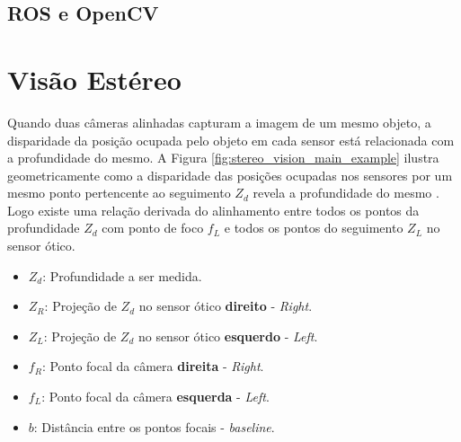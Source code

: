 \pagebreak

\subsection{ROS e OpenCV}



\pagebreak






\section{Visão Estéreo}

Quando duas câmeras alinhadas capturam a imagem de um mesmo objeto, a disparidade da posição ocupada pelo objeto em cada sensor está relacionada com a profundidade do mesmo.
A Figura \ref{fig:stereo_vision_main_example} ilustra geometricamente como a disparidade das posições ocupadas nos sensores por um mesmo ponto pertencente ao seguimento $Z_d$ revela a profundidade do mesmo \cite{Kyto2011}.
Logo existe uma relação derivada do alinhamento entre todos os pontos da profundidade $Z_d$ com ponto de foco $f_L$ e todos os pontos do seguimento $Z_L$ no sensor ótico.

\begin{itemize}
    \item \textbf{$Z_d$}: Profundidade a ser medida.
    \item \textbf{$Z_R$}: Projeção de $Z_{d}$ no sensor ótico \textbf{direito} - \textit{Right}.
    \item \textbf{$Z_L$}: Projeção de $Z_{d}$ no sensor ótico \textbf{esquerdo} - \textit{Left}.
    \item \textbf{$f_R$}: Ponto focal da câmera \textbf{direita} - \textit{Right}.
    \item \textbf{$f_L$}: Ponto focal da câmera \textbf{esquerda} - \textit{Left}.
    \item \textbf{$b$}: Distância entre os pontos focais - \textit{baseline}.
\end{itemize}

